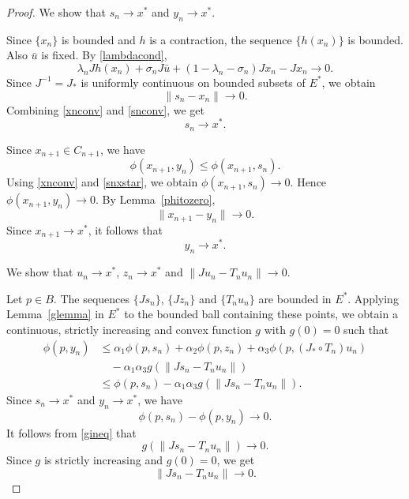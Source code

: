 \documentclass[leqno,12pt]{amsart}
\theoremstyle{definition}
\numberwithin{equation}{section}
\begin{document}
\begin{proof}
 We show that $s_n\to x^{*}$ and $y_n\to x^{*}$.

Since $\{x_n\}$ is bounded and $h$ is a contraction, the sequence $\{h(x_n)\}$ is bounded. Also $\bar u$ is fixed. By \eqref{lambdacond},
\[
\lambda_nJh(x_n)+\sigma_nJ\bar u+(1-\lambda_n-\sigma_n)Jx_n-Jx_n\to 0.
\]
Since $J^{-1}=J_{*}$ is uniformly continuous on bounded subsets of $E^{*}$, we obtain
\begin{equation}\label{snconv}
\|s_n-x_n\|\to 0.
\end{equation}
Combining \eqref{xnconv} and \eqref{snconv}, we get
\begin{equation}\label{snxstar}
s_n\to x^{*}.
\end{equation}

Since $x_{n+1}\in C_{n+1}$, we have
\[
\phi(x_{n+1},y_n)\leq \phi(x_{n+1},s_n).
\]
Using \eqref{xnconv} and \eqref{snxstar}, we obtain $\phi(x_{n+1},s_n)\to 0$. Hence $\phi(x_{n+1},y_n)\to 0$. By Lemma~\ref{phitozero},
\[
\|x_{n+1}-y_n\|\to 0.
\]
Since $x_{n+1}\to x^{*}$, it follows that
\begin{equation}\label{ynconv}
y_n\to x^{*}.
\end{equation}

 We show that $u_n\to x^{*}$, $z_n\to x^{*}$ and $\|Ju_n-T_nu_n\|\to 0$.

Let $p\in B$. The sequences $\{Js_n\}$, $\{Jz_n\}$ and $\{T_nu_n\}$ are bounded in $E^{*}$. Applying Lemma~\ref{glemma} in $E^{*}$ to the bounded ball containing these points, we obtain a continuous, strictly increasing and convex function $g$ with $g(0)=0$ such that
\begin{align}\label{gineq}
\phi(p,y_n)
&\leq \alpha_1\phi(p,s_n)+\alpha_2\phi(p,z_n)+\alpha_3\phi(p,(J_{*}\circ T_n)u_n)\nonumber\\
&\quad -\alpha_1\alpha_3g(\|Js_n-T_nu_n\|)\nonumber\\
&\leq \phi(p,s_n)-\alpha_1\alpha_3g(\|Js_n-T_nu_n\|).
\end{align}
Since $s_n\to x^{*}$ and $y_n\to x^{*}$, we have
\[
\phi(p,s_n)-\phi(p,y_n)\to 0.
\]
It follows from \eqref{gineq} that
\[
g(\|Js_n-T_nu_n\|)\to 0.
\]
Since $g$ is strictly increasing and $g(0)=0$, we get
\begin{equation}\label{residual1}
\|Js_n-T_nu_n\|\to 0.
\end{equation}


\end{proof}
\end{document}

